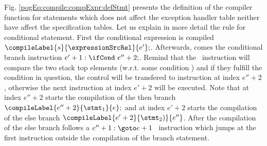 Fig. \ref{pogEq:compile:compExpr:defStmt} presents the definition 
of the compiler function for statements which does not affect the exception handler table 
neither have affect the specification tables.
Let us explain in more detail the rule for 
conditional statement. First the conditional expression is compiled $\compileLabel{s}{\expressionSrcRel}{e'};$.
Afterwards, comes the conditional branch instruction $e' + 1: \ifCond \ e'' + 2;$. Remind that the \ifCond \ 
instruction will compare the two stack top elements  (w.r.t. some condition ) and if they fulfill the condition
in question, the control will be transfered to instruction at index $ e'' +2 $, otherwise the next instruction
at index $e' + 2$ will be executed. Note that at index $ e''+2$ starts the compilation of the then branch 
$\compileLabel{e'' +  2}{\stmt_1}{ e  };$ and at index $ e'+2$ starts the compilation of the else branch 
$\compileLabel{e' + 2}{\stmt_2)}{e''}$. After the compilation of the else branch follows a $ e'' + 1: \goto e + 1$ \ instruction
which jumps at the first instruction  outside the compilation of the branch statement. 






